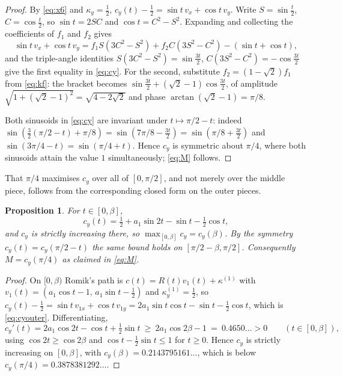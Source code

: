 \documentclass[11pt]{article}
\newtheorem{proposition}[theorem]{Proposition}
\theoremstyle{definition}
\DeclareMathOperator{\arctanop}{arctan}
\begin{document}
\begin{proof}
By \eqref{eq:x6} and $\kappa_y=\tfrac12$, $c_y(t)-\tfrac12=\sin t\,v_x+\cos t\,v_y$.
Write $S=\sin\frac t2$, $C=\cos\frac t2$, so $\sin t=2SC$ and $\cos t=C^2-S^2$.
Expanding and collecting the coefficients of $f_1$ and $f_2$ gives
\[
  \sin t\,v_x+\cos t\,v_y
  = f_1 S(3C^2-S^2)+f_2 C(3S^2-C^2)-(\sin t+\cos t),
\]
and the triple-angle identities $S(3C^2-S^2)=\sin\frac{3t}{2}$,
$C(3S^2-C^2)=-\cos\frac{3t}{2}$ give the first equality in \eqref{eq:cy}. For the
second, substitute $f_2=(1-\sqrt2)f_1$ from \eqref{eq:kf}: the bracket becomes
$\sin\frac{3t}{2}+(\sqrt2-1)\cos\frac{3t}{2}$, of amplitude
$\sqrt{1+(\sqrt2-1)^2}=\sqrt{4-2\sqrt2}$ and phase $\arctanop(\sqrt2-1)=\pi/8$.

Both sinusoids in \eqref{eq:cy} are invariant under $t\mapsto\pi/2-t$: indeed
$\sin(\tfrac{3}{2}(\pi/2-t)+\pi/8)=\sin(7\pi/8-\tfrac{3t}{2})=\sin(\pi/8+\tfrac{3t}{2})$
and $\sin(3\pi/4-t)=\sin(\pi/4+t)$. Hence $c_y$ is symmetric about $\pi/4$, where
both sinusoids attain the value $1$ simultaneously; \eqref{eq:M} follows. \end{proof}

That $\pi/4$ maximises $c_y$ over all of $[0,\pi/2]$, and not merely over the
middle piece, follows from the corresponding closed form on the outer pieces.

\begin{proposition}\label{prop:outer}
For $t\in[0,\beta]$,
\begin{equation}\label{eq:cyouter}
  c_y(t)=\tfrac12+a_1\sin 2t-\sin t-\tfrac12\cos t,
\end{equation}
and $c_y$ is strictly increasing there, so $\max_{[0,\beta]}c_y=c_y(\beta)$. By
the symmetry $c_y(t)=c_y(\pi/2-t)$ the same bound holds on $[\pi/2-\beta,\pi/2]$.
Consequently $M=c_y(\pi/4)$ as claimed in \eqref{eq:M}.
\end{proposition}

\begin{proof}
On $[0,\beta)$ Romik's path is $c(t)=R(t)v_1(t)+\kappa^{(1)}$ with
$v_1(t)=(a_1\cos t-1,\,a_1\sin t-\tfrac12)$ and $\kappa^{(1)}_y=\tfrac12$, so
$c_y(t)-\tfrac12=\sin t\,v_{1x}+\cos t\,v_{1y}=2a_1\sin t\cos t-\sin t-\tfrac12\cos t$,
which is \eqref{eq:cyouter}. Differentiating,
\[
  c_y'(t)=2a_1\cos 2t-\cos t+\tfrac12\sin t
        \ \ge\ 2a_1\cos 2\beta-1\ =\ 0.4650\ldots>0
        \qquad (t\in[0,\beta]),
\]
using $\cos 2t\ge\cos 2\beta$ and $\cos t-\tfrac12\sin t\le 1$ for $t\ge0$.
Hence $c_y$ is strictly increasing on $[0,\beta]$, with
$c_y(\beta)=0.2143795161\ldots$, which is below
$c_y(\pi/4)=0.3878381292\ldots$.
\end{proof}
\end{document}
